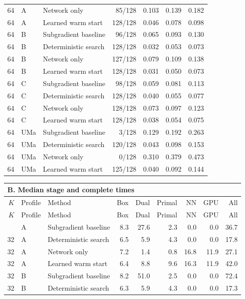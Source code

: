 \documentclass[10pt,letterpaper]{article}
\begin{document}
\begin{longtable}{rllrrrr}
64 & A & Network only & 85/128 & 0.103 & 0.139 & 0.182\\
64 & A & Learned warm start & 128/128 & 0.046 & 0.078 & 0.098\\
64 & B & Subgradient baseline & 96/128 & 0.065 & 0.093 & 0.130\\
64 & B & Deterministic search & 128/128 & 0.032 & 0.053 & 0.073\\
64 & B & Network only & 127/128 & 0.079 & 0.109 & 0.138\\
64 & B & Learned warm start & 128/128 & 0.031 & 0.050 & 0.073\\
64 & C & Subgradient baseline & 98/128 & 0.059 & 0.081 & 0.113\\
64 & C & Deterministic search & 128/128 & 0.040 & 0.055 & 0.077\\
64 & C & Network only & 128/128 & 0.073 & 0.097 & 0.123\\
64 & C & Learned warm start & 128/128 & 0.038 & 0.054 & 0.075\\
64 & UMa & Subgradient baseline & 3/128 & 0.129 & 0.192 & 0.263\\
64 & UMa & Deterministic search & 120/128 & 0.043 & 0.098 & 0.153\\
64 & UMa & Network only & 0/128 & 0.310 & 0.379 & 0.473\\
64 & UMa & Learned warm start & 125/128 & 0.040 & 0.092 & 0.144\\\end{longtable}\addtocounter{table}{-1}\renewcommand{\theHtable}{previous.\arabic{table}B}\begin{longtable}{rllrrrrrr}\multicolumn{9}{l}{\textbf{B. Median stage and complete times}}\\\toprule $K$ & Profile & Method & Box & Dual & Primal & NN & GPU & All\\\midrule\endfirsthead\toprule $K$ & Profile & Method & Box & Dual & Primal & NN & GPU & All\\\midrule\endhead\bottomrule\endfoot
32 & A & Subgradient baseline & 8.3 & 27.6 & 2.3 & 0.0 & 0.0 & 36.7\\
32 & A & Deterministic search & 6.5 & 5.9 & 4.3 & 0.0 & 0.0 & 17.8\\
32 & A & Network only & 7.2 & 1.4 & 0.8 & 16.8 & 11.9 & 27.1\\
32 & A & Learned warm start & 6.4 & 8.8 & 9.6 & 16.3 & 11.9 & 42.0\\
32 & B & Subgradient baseline & 8.2 & 51.0 & 2.5 & 0.0 & 0.0 & 72.4\\
32 & B & Deterministic search & 6.3 & 5.9 & 4.3 & 0.0 & 0.0 & 17.3\\

\end{longtable}
\end{document}
